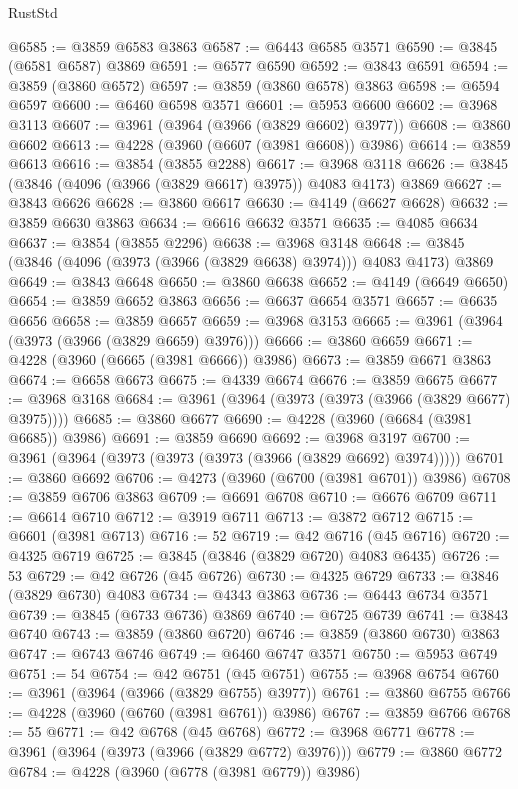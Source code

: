 \begin{lexlean}{RustStd}
\begin{coremodule}
@6585 := @3859 @6583 @3863
@6587 := @6443 @6585 @3571
@6590 := @3845 (@6581 @6587) @3869
@6591 := @6577 @6590
@6592 := @3843 @6591
@6594 := @3859 (@3860 @6572)
@6597 := @3859 (@3860 @6578) @3863
@6598 := @6594 @6597
@6600 := @6460 @6598 @3571
@6601 := @5953 @6600
@6602 := @3968 @3113
@6607 := @3961 (@3964 (@3966 (@3829 @6602) @3977))
@6608 := @3860 @6602
@6613 := @4228 (@3960 (@6607 (@3981 @6608)) @3986)
@6614 := @3859 @6613
@6616 := @3854 (@3855 @2288)
@6617 := @3968 @3118
@6626 := @3845 (@3846 (@4096 (@3966 (@3829 @6617) @3975)) @4083 @4173) @3869
@6627 := @3843 @6626
@6628 := @3860 @6617
@6630 := @4149 (@6627 @6628)
@6632 := @3859 @6630 @3863
@6634 := @6616 @6632 @3571
@6635 := @4085 @6634
@6637 := @3854 (@3855 @2296)
@6638 := @3968 @3148
@6648 := @3845 (@3846 (@4096 (@3973 (@3966 (@3829 @6638) @3974))) @4083 @4173) @3869
@6649 := @3843 @6648
@6650 := @3860 @6638
@6652 := @4149 (@6649 @6650)
@6654 := @3859 @6652 @3863
@6656 := @6637 @6654 @3571
@6657 := @6635 @6656
@6658 := @3859 @6657
@6659 := @3968 @3153
@6665 := @3961 (@3964 (@3973 (@3966 (@3829 @6659) @3976)))
@6666 := @3860 @6659
@6671 := @4228 (@3960 (@6665 (@3981 @6666)) @3986)
@6673 := @3859 @6671 @3863
@6674 := @6658 @6673
@6675 := @4339 @6674
@6676 := @3859 @6675
@6677 := @3968 @3168
@6684 := @3961 (@3964 (@3973 (@3973 (@3966 (@3829 @6677) @3975))))
@6685 := @3860 @6677
@6690 := @4228 (@3960 (@6684 (@3981 @6685)) @3986)
@6691 := @3859 @6690
@6692 := @3968 @3197
@6700 := @3961 (@3964 (@3973 (@3973 (@3973 (@3966 (@3829 @6692) @3974)))))
@6701 := @3860 @6692
@6706 := @4273 (@3960 (@6700 (@3981 @6701)) @3986)
@6708 := @3859 @6706 @3863
@6709 := @6691 @6708
@6710 := @6676 @6709
@6711 := @6614 @6710
@6712 := @3919 @6711
@6713 := @3872 @6712
@6715 := @6601 (@3981 @6713)
@6716 := 52
@6719 := @42 @6716 (@45 @6716)
@6720 := @4325 @6719
@6725 := @3845 (@3846 (@3829 @6720) @4083 @6435)
@6726 := 53
@6729 := @42 @6726 (@45 @6726)
@6730 := @4325 @6729
@6733 := @3846 (@3829 @6730) @4083
@6734 := @4343 @3863
@6736 := @6443 @6734 @3571
@6739 := @3845 (@6733 @6736) @3869
@6740 := @6725 @6739
@6741 := @3843 @6740
@6743 := @3859 (@3860 @6720)
@6746 := @3859 (@3860 @6730) @3863
@6747 := @6743 @6746
@6749 := @6460 @6747 @3571
@6750 := @5953 @6749
@6751 := 54
@6754 := @42 @6751 (@45 @6751)
@6755 := @3968 @6754
@6760 := @3961 (@3964 (@3966 (@3829 @6755) @3977))
@6761 := @3860 @6755
@6766 := @4228 (@3960 (@6760 (@3981 @6761)) @3986)
@6767 := @3859 @6766
@6768 := 55
@6771 := @42 @6768 (@45 @6768)
@6772 := @3968 @6771
@6778 := @3961 (@3964 (@3973 (@3966 (@3829 @6772) @3976)))
@6779 := @3860 @6772
@6784 := @4228 (@3960 (@6778 (@3981 @6779)) @3986)

\end{coremodule}
\end{lexlean}

